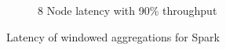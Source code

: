 \begin{figure}
\begin{subfigure}[b]{0.3\textwidth}
        \caption{8 Node latency with 90\% throughput }
    \end{subfigure}



        \caption{Latency of windowed aggregations for Spark}
\end{figure}